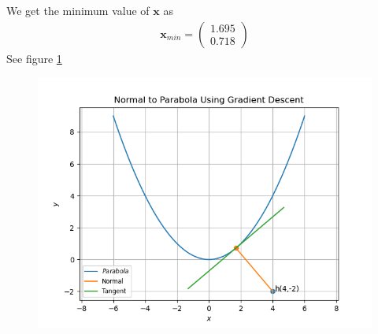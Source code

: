 \documentclass[12pt]{article}
\newcommand{\myvec}[1]{\ensuremath{\begin{pmatrix}#1\end{pmatrix}}}
\let\vec\mathbf
\begin{document}
We get the minimum value of $\vec{x}$ as
\begin{align}
	\vec{x}_{min} = \myvec{1.695\\0.718}
\end{align}
See figure \ref{fig:Fig1}
\begin{figure}[!h]
	\begin{center} 
	    \includegraphics[width=\columnwidth]{figs/12_6_6_4_gradient}
	\end{center}
\caption{}
\label{fig:Fig1}
\end{figure}
\end{document}

